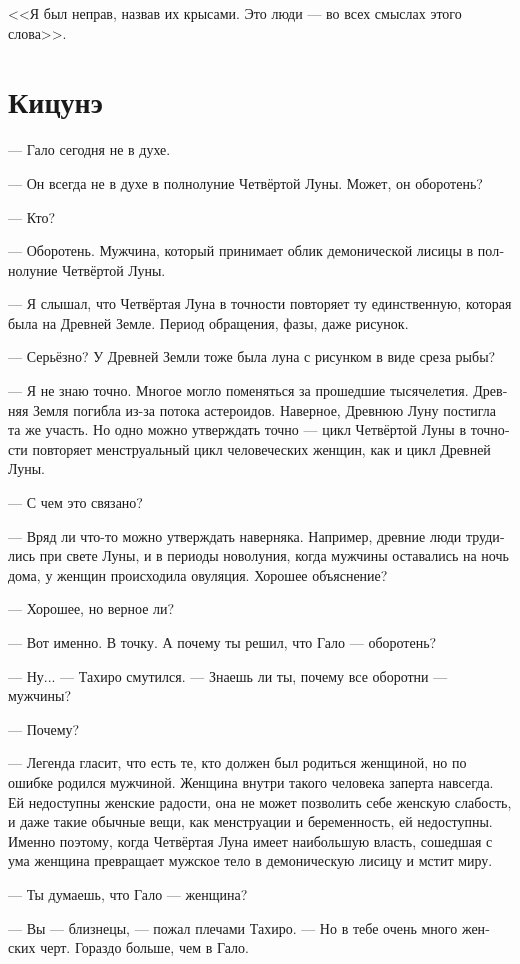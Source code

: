 \documentclass[a4paper,12pt,fleqn]{book}\usepackage{polyglossia}\setdefaultlanguage[babelshorthands=true]{russian}\setotherlanguage{english}\defaultfontfeatures{Ligatures=TeX,Mapping=tex-text}\usepackage{xcolor}\newcommand{\ml}[3]{#2}
\begin{document}
{<<Я был неправ, назвав их крысами.
Это люди --- во всех смыслах этого слова>>.

\section{Кицунэ}

--- Гало сегодня не в духе.

--- Он всегда не в духе в полнолуние Четвёртой Луны.
Может, он оборотень?

--- Кто?

--- Оборотень.
Мужчина, который принимает облик демонической лисицы в полнолуние Четвёртой Луны.

--- Я слышал, что Четвёртая Луна в точности повторяет ту единственную, которая была на Древней Земле.
Период обращения, фазы, даже рисунок.

--- Серьёзно?
У Древней Земли тоже была луна с рисунком в виде среза рыбы?

--- Я не знаю точно.
Многое могло поменяться за прошедшие тысячелетия.
Древняя Земля погибла из-за потока астероидов.
Наверное, Древнюю Луну постигла та же участь.
Но одно можно утверждать точно --- цикл Четвёртой Луны в точности повторяет менструальный цикл человеческих женщин, как и цикл Древней Луны.

--- С чем это связано?

--- Вряд ли что-то можно утверждать наверняка.
Например, древние люди трудились при свете Луны, и в периоды новолуния, когда мужчины оставались на ночь дома, у женщин происходила овуляция.
Хорошее объяснение?

--- Хорошее, но верное ли?

--- Вот именно.
В точку.
А почему ты решил, что Гало --- оборотень?

--- Ну... --- Тахиро смутился.
--- Знаешь ли ты, почему все оборотни --- мужчины?

--- Почему?

--- Легенда гласит, что есть те, кто должен был родиться женщиной, но по ошибке родился мужчиной.
Женщина внутри такого человека заперта навсегда.
Ей недоступны женские радости, она не может позволить себе женскую слабость, и даже такие обычные вещи, как менструации и беременность, ей недоступны.
Именно поэтому, когда Четвёртая Луна имеет наибольшую власть, сошедшая с ума женщина превращает мужское тело в демоническую лисицу и мстит миру.

--- Ты думаешь, что Гало --- женщина?

--- Вы --- близнецы, --- пожал плечами Тахиро.
--- Но в тебе очень много женских черт.
Гораздо больше, чем в Гало.

}
\end{document}
